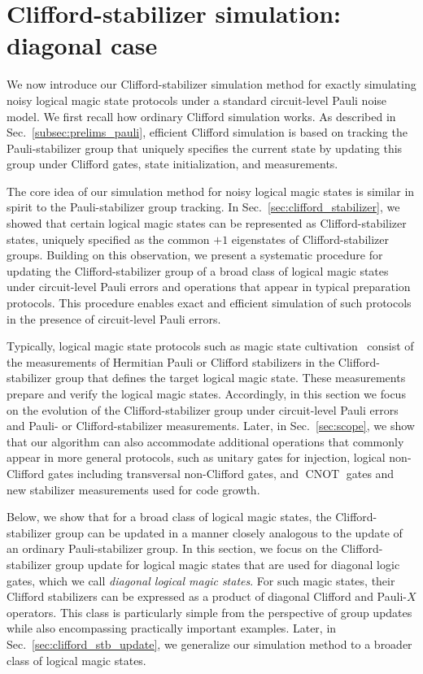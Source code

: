 \documentclass[
 reprint,
 amsmath,amssymb,
 pra,superscriptaddress, nofootinbib
]{revtex4-2}
\theoremstyle{definition}
\theoremstyle{plain}
\newcommand{\CNOT}{\operatorname{CNOT}}
\begin{document}
\section{Clifford-stabilizer simulation: diagonal case}\label{sec:clifford_stb_update_diagonal}

We now introduce our Clifford-stabilizer simulation method for exactly simulating noisy logical magic state protocols under a standard circuit-level Pauli noise model. We first recall how ordinary Clifford simulation works. As described in Sec.~\ref{subsec:prelims_pauli}, efficient Clifford simulation is based on tracking the Pauli-stabilizer group that uniquely specifies the current state by updating this group under Clifford gates, state initialization, and measurements.

The core idea of our simulation method for noisy logical magic states is similar in spirit to the Pauli-stabilizer group tracking.
In Sec.~\ref{sec:clifford_stabilizer}, we showed that certain logical magic states can be represented as Clifford-stabilizer states, uniquely specified as the common $+1$ eigenstates of Clifford-stabilizer groups. Building on this observation, we present a systematic procedure for updating the Clifford-stabilizer group of a broad class of logical magic states under circuit-level Pauli errors and operations that appear in typical preparation protocols.
This procedure enables exact and efficient simulation of such protocols in the presence of circuit-level Pauli errors.

Typically, logical magic state protocols such as magic state cultivation~\cite{gidney2024magicstatecultivationgrowing,thxx-njr6,9kys-3whh,gpvl-lg4c,p8tw-6kq9,claes2025cultivatingtstatessurface,ch5r-cnfq,hirano2026efficientmagicstatecultivation,hetenyi2026constantdepthmagicstate} consist of the measurements of Hermitian Pauli or Clifford stabilizers in the Clifford-stabilizer group that defines the target logical magic state. 
These measurements prepare and verify the logical magic states. Accordingly, in this section we focus on the evolution of the Clifford-stabilizer group under circuit-level Pauli errors and Pauli- or Clifford-stabilizer measurements.
Later, in Sec.~\ref{sec:scope}, we show that our algorithm can also accommodate additional operations that commonly appear in more general protocols, such as unitary gates for injection, logical non-Clifford gates including transversal non-Clifford gates, and $\CNOT$ gates and new stabilizer measurements used for code growth.

Below, we show that for a broad class of logical magic states, the Clifford-stabilizer group can be updated in a manner closely analogous to the update of an ordinary Pauli-stabilizer group. In this section, we focus on the Clifford-stabilizer group update for logical magic states that are used for diagonal logic gates, which we call \emph{diagonal logical magic states}.
For such magic states, their Clifford stabilizers can be expressed as a product of diagonal Clifford and Pauli-$X$ operators. This class is particularly simple from the perspective of group updates while also encompassing practically important examples.
Later, in Sec.~\ref{sec:clifford_stb_update}, we generalize our simulation method to a broader class of logical magic states.
\end{document}
